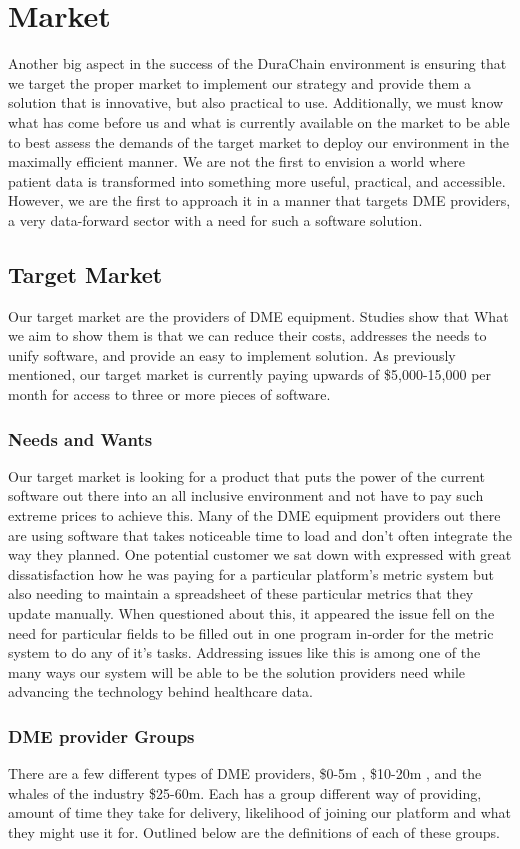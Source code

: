 \documentclass[letterpaper]{article}
\begin{document}
\section{Market}
Another big aspect in the success of the DuraChain environment is ensuring that we target the proper market to implement our strategy and provide them a solution that is innovative, but also practical to use. Additionally, we must know what has come before us and what is currently available on the market to be able to best assess the demands of the target market to deploy our environment in the maximally efficient manner. We are not the first to envision a world where patient data is transformed into something more useful, practical, and accessible. However, we are the first to approach it in a manner that targets DME providers, a very data-forward sector with a need for such a software solution.
%
\subsection{Target Market}
Our target market are the providers of DME equipment. Studies show that What we aim to show them is that we can reduce their costs, addresses the needs to unify software, and provide an easy to implement solution. As previously mentioned, our target market is currently paying upwards of \$5,000-15,000 per month for access to three or more pieces of software.
%
  \subsubsection{Needs and Wants}
  Our target market is looking for a product that puts the power of the current software out there into an all inclusive environment and not have to pay such extreme prices to achieve this. Many of the DME equipment providers out there are using software that takes noticeable time to load and don’t often integrate the way they planned.
%
  One potential customer we sat down with expressed with great dissatisfaction how he was paying for a particular platform’s metric system but also needing to maintain a spreadsheet of these particular metrics that they update manually. When questioned about this, it appeared the issue fell on the need for particular fields to be filled out in one program in-order for the metric system to do any of it’s tasks. Addressing issues like this is among one of the many ways our system will be able to be the solution providers need while advancing the technology behind healthcare data.
%
  \subsubsection{DME provider Groups}
  There are a few different types of DME providers, \$0-5m , \$10-20m , and the whales of the industry \$25-60m. Each has a group different way of providing, amount of time they take for delivery, likelihood of joining our platform and what they might use it for. Outlined below are the definitions of each of these groups.
%
\end{document}
